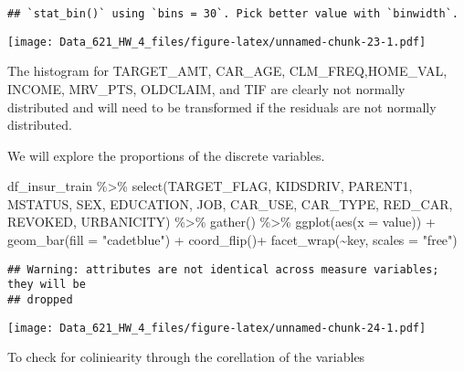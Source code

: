 \documentclass[
]{article}
\newenvironment{Shaded}{\begin{snugshade}}{\end{snugshade}}
\newcommand{\AttributeTok}[1]{\textcolor[rgb]{0.77,0.63,0.00}{#1}}
\newcommand{\FunctionTok}[1]{\textcolor[rgb]{0.00,0.00,0.00}{#1}}
\newcommand{\NormalTok}[1]{#1}
\newcommand{\SpecialCharTok}[1]{\textcolor[rgb]{0.00,0.00,0.00}{#1}}
\newcommand{\StringTok}[1]{\textcolor[rgb]{0.31,0.60,0.02}{#1}}
\begin{document}
\begin{verbatim}
## `stat_bin()` using `bins = 30`. Pick better value with `binwidth`.
\end{verbatim}

\texttt{[image: Data\_621\_HW\_4\_files/figure-latex/unnamed-chunk-23-1.pdf]}

The histogram for TARGET\_AMT, CAR\_AGE, CLM\_FREQ,HOME\_VAL, INCOME,
MRV\_PTS, OLDCLAIM, and TIF are clearly not normally distributed and
will need to be transformed if the residuals are not normally
distributed.

We will explore the proportions of the discrete variables.

\begin{Shaded}
\begin{Highlighting}[]
\NormalTok{df\_insur\_train }\SpecialCharTok{\%\textgreater{}\%} 
  \FunctionTok{select}\NormalTok{(TARGET\_FLAG, KIDSDRIV, PARENT1, MSTATUS, SEX, EDUCATION,}
\NormalTok{         JOB, CAR\_USE, CAR\_TYPE, RED\_CAR, REVOKED, URBANICITY) }\SpecialCharTok{\%\textgreater{}\%} 
  \FunctionTok{gather}\NormalTok{() }\SpecialCharTok{\%\textgreater{}\%} 
  \FunctionTok{ggplot}\NormalTok{(}\FunctionTok{aes}\NormalTok{(}\AttributeTok{x =}\NormalTok{ value)) }\SpecialCharTok{+} 
  \FunctionTok{geom\_bar}\NormalTok{(}\AttributeTok{fill =} \StringTok{"cadetblue"}\NormalTok{) }\SpecialCharTok{+} 
  \FunctionTok{coord\_flip}\NormalTok{()}\SpecialCharTok{+}
  \FunctionTok{facet\_wrap}\NormalTok{(}\SpecialCharTok{\textasciitilde{}}\NormalTok{key, }\AttributeTok{scales =} \StringTok{"free"}\NormalTok{)}
\end{Highlighting}
\end{Shaded}

\begin{verbatim}
## Warning: attributes are not identical across measure variables; they will be
## dropped
\end{verbatim}

\texttt{[image: Data\_621\_HW\_4\_files/figure-latex/unnamed-chunk-24-1.pdf]}

To check for coliniearity through the corellation of the variables
\end{document}
